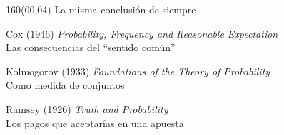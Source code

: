 \documentclass[shownotes,aspectratio=169]{beamer}
\begin{document}
\begin{frame}[plain] \centering
\begin{textblock}{160}(00,04)
\centering \LARGE La misma conclusión de siempre \\
\end{textblock}
\vspace{1.2cm} \centering \large

Cox (1946) \emph{Probability, Frequency and Reasonable Expectation}\\[0.1cm]
Las consecuencias del ``sentido común''

\vspace{0.8cm}

Kolmogorov (1933) \emph{Foundations of the Theory of Probability} \\[0.1cm]
Como medida de conjuntos

\vspace{0.8cm}

Ramsey (1926) \emph{Truth and Probability} \\[0.1cm]
Los pagos que aceptarías en una apuesta

\vspace{0.4cm}


\end{frame}
\end{document}
